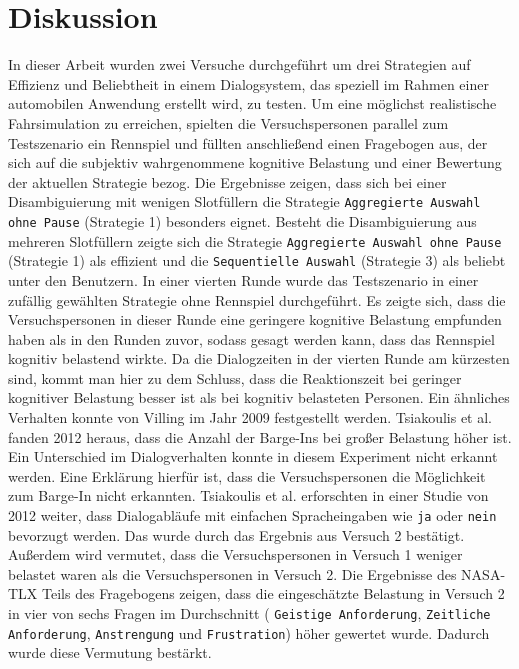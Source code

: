 \documentclass[12pt,a4paper]{scrartcl}
\begin{document}
\section{Diskussion}
\label{discussion}
In dieser Arbeit wurden zwei Versuche durchgeführt um drei Strategien auf Effizienz und Beliebtheit in einem Dialogsystem, das speziell im Rahmen einer automobilen Anwendung erstellt wird, zu testen. Um eine möglichst realistische Fahrsimulation zu erreichen, spielten die Versuchspersonen parallel zum Testszenario ein Rennspiel und füllten anschließend einen Fragebogen aus, der sich auf die subjektiv wahrgenommene kognitive Belastung und einer Bewertung der aktuellen Strategie bezog.
Die Ergebnisse zeigen, dass sich bei einer Disambiguierung mit wenigen Slotfüllern die Strategie \texttt{Aggregierte Auswahl ohne Pause} (Strategie 1) besonders eignet. Besteht die Disambiguierung aus mehreren Slotfüllern zeigte sich die Strategie \texttt{Aggregierte Auswahl ohne Pause} (Strategie 1) als effizient und die \texttt{Sequentielle Auswahl} (Strategie 3) als beliebt unter den Benutzern. \newline \newline
In einer vierten Runde wurde das Testszenario in einer zufällig gewählten Strategie ohne Rennspiel durchgeführt. Es zeigte sich, dass die Versuchspersonen in dieser Runde eine geringere kognitive Belastung empfunden haben als in den Runden zuvor, sodass gesagt werden kann, dass das Rennspiel kognitiv belastend wirkte. Da die Dialogzeiten in der vierten Runde am kürzesten sind, kommt man hier zu dem Schluss, dass die Reaktionszeit bei geringer kognitiver Belastung besser ist als bei kognitiv belasteten Personen. Ein ähnliches Verhalten konnte von Villing im Jahr 2009  festgestellt werden. Tsiakoulis et al. fanden 2012 heraus, dass die Anzahl der Barge-Ins bei großer Belastung höher ist. Ein Unterschied im Dialogverhalten konnte in diesem Experiment nicht erkannt werden. Eine Erklärung hierfür ist, dass die Versuchspersonen die Möglichkeit zum Barge-In nicht erkannten. Tsiakoulis et al. erforschten in einer Studie von 2012 weiter, dass Dialogabläufe mit einfachen Spracheingaben wie \texttt{ja} oder \texttt{nein} bevorzugt werden. Das wurde durch das Ergebnis aus Versuch 2 bestätigt. Außerdem wird vermutet, dass die Versuchspersonen in Versuch 1 weniger belastet waren als die Versuchspersonen in Versuch 2. Die Ergebnisse des NASA-TLX Teils des Fragebogens zeigen, dass die eingeschätzte Belastung in Versuch 2 in vier von sechs Fragen im Durchschnitt ( \texttt{Geistige Anforderung}, \texttt{Zeitliche Anforderung}, \texttt{Anstrengung} und \texttt{Frustration}) höher gewertet wurde. Dadurch wurde diese Vermutung bestärkt. \newline \newline
\end{document}
